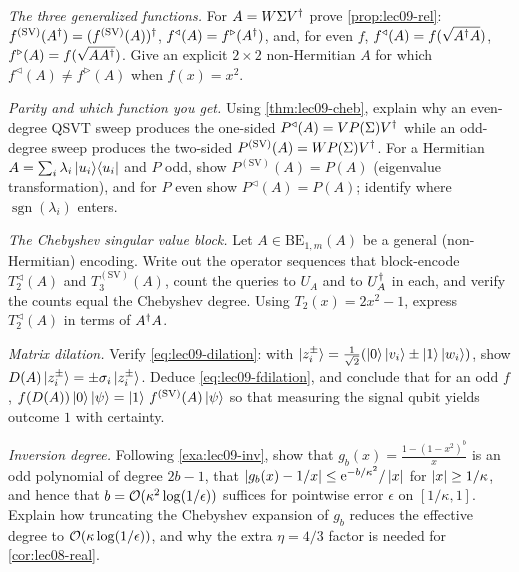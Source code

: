 \exercisesection

\begin{exercise}\label{ex:lec09-1}
\emph{The three generalized functions.} For $A=W\Sigma V^{\dagger}$ prove
\cref{prop:lec09-rel}: $f^{(\mathrm{SV})}(A^{\dagger})=(f^{(\mathrm{SV})}(A))^{\dagger}$,
$f^{\triangleleft}(A)=f^{\triangleright}(A^{\dagger})$, and, for even $f$,
$f^{\triangleleft}(A)=f(\sqrt{A^{\dagger} A})$, $f^{\triangleright}(A)=f(\sqrt{AA^{\dagger}})$.
Give an explicit $2\times2$ non-Hermitian $A$ for which $f^{\triangleleft}(A)\neq
f^{\triangleright}(A)$ when $f(x)=x^2$.
\end{exercise}

\begin{exercise}\label{ex:lec09-2}
\emph{Parity and which function you get.} Using \cref{thm:lec09-cheb}, explain why an
even-degree QSVT sweep produces the one-sided $P^{\triangleleft}(A)=VP(\Sigma)V^{\dagger}$
while an odd-degree sweep produces the two-sided $P^{(\mathrm{SV})}(A)=WP(\Sigma)V^{\dagger}$.
For a Hermitian $A=\sum_i\lambda_i\ket{u_i}\!\bra{u_i}$ and $P$ odd, show
$P^{(\mathrm{SV})}(A)=P(A)$ (eigenvalue transformation), and for $P$ even show
$P^{\triangleleft}(A)=P(A)$; identify where $\operatorname{sgn}(\lambda_i)$ enters.
\end{exercise}

\begin{exercise}\label{ex:lec09-3}
\emph{The Chebyshev singular value block.} Let $A\in\mathrm{BE}_{1,m}(A)$ be a general
(non-Hermitian) encoding. Write out the operator sequences that block-encode
$T_2^{\triangleleft}(A)$ and $T_3^{(\mathrm{SV})}(A)$, count the queries to $U_A$ and to
$U_A^{\dagger}$ in each, and verify the counts equal the Chebyshev degree. Using
$T_2(x)=2x^2-1$, express $T_2^{\triangleleft}(A)$ in terms of $A^{\dagger} A$.
\end{exercise}

\begin{exercise}\label{ex:lec09-4}
\emph{Matrix dilation.} Verify \eqref{eq:lec09-dilation}: with $\ket{z_i^\pm}=
\tfrac1{\sqrt2}(\ket0\ket{v_i}\pm\ket1\ket{w_i})$, show $D(A)\ket{z_i^\pm}=
\pm\sigma_i\ket{z_i^\pm}$. Deduce \eqref{eq:lec09-fdilation}, and conclude that for an
odd $f$, $f(D(A))\ket0\ket\psi=\ket1\,f^{(\mathrm{SV})}(A)\ket\psi$ so that measuring
the signal qubit yields outcome $1$ with certainty.
\end{exercise}

\begin{exercise}\label{ex:lec09-5}
\emph{Inversion degree.} Following \cref{exa:lec09-inv}, show that
$g_b(x)=\tfrac{1-(1-x^2)^b}{x}$ is an odd polynomial of degree $2b-1$, that
$\left\lvert g_b(x)-1/x \right\rvert\le\mathrm{e}^{-b/\kappa^2}/\left\lvert x \right\rvert$ for $\left\lvert x \right\rvert\ge1/\kappa$, and hence that
$b=\mathcal{O}(\kappa^2\log(1/\epsilon))$ suffices for pointwise error $\epsilon$ on
$[1/\kappa,1]$. Explain how truncating the Chebyshev expansion of $g_b$ reduces the
effective degree to $\mathcal{O}(\kappa\log(1/\epsilon))$, and why the extra $\eta=4/3$ factor
is needed for \cref{cor:lec08-real}.
\end{exercise}

